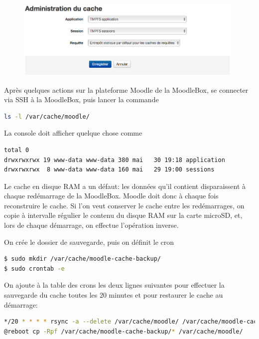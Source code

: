 \documentclass[11pt]{article}
\begin{document}
\begin{figure}[!ht]
\begin{minipage}[b]{\linewidth}
\centering
\includegraphics[width=11cm]{cache-association.png}
\end{minipage}
\end{figure}

\begin{verification}
Après quelques actions sur la plateforme Moodle de la MoodleBox, se connecter via SSH à la MoodleBox, puis lancer la commande
\begin{lstlisting}[language=bash]
ls -l /var/cache/moodle/
\end{lstlisting}
La console doit afficher quelque chose comme
\begin{lstlisting}[language=bash]
total 0
drwxrwxrwx 19 www-data www-data 380 mai   30 19:18 application
drwxrwxrwx  8 www-data www-data 160 mai   29 19:00 sessions
\end{lstlisting}
\end{verification}

Le cache en disque RAM a un défaut: les données qu'il contient disparaissent à chaque redémarrage de la MoodleBox. Moodle doit donc à chaque fois reconstruire le cache. Si l'on veut conserver le cache entre les redémarrages, on copie à intervalle régulier le contenu du disque RAM sur la carte microSD, et, lors de chaque démarrage, on effectue l'opération inverse.

On crée le dossier de sauvegarde, puis on définit le cron
\begin{lstlisting}[language=bash]
$ sudo mkdir /var/cache/moodle-cache-backup/
$ sudo crontab -e
\end{lstlisting}

On ajoute à la table des crons les deux lignes suivantes pour effectuer la sauvegarde du cache toutes les 20 minutes et pour restaurer le cache au démarrage:
\begin{lstlisting}[language=bash]
*/20 * * * * rsync -a --delete /var/cache/moodle/ /var/cache/moodle-cache-backup/
@reboot cp -Rpf /var/cache/moodle-cache-backup/* /var/cache/moodle/
\end{lstlisting}
\end{document}
